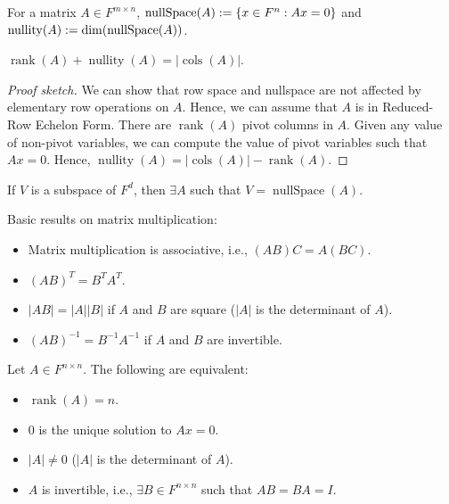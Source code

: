 \documentclass[a4paper,12pt,fleqn]{article}
\newenvironment*{tightemize}{\begin{itemize}[noitemsep]}{\end{itemize}}
\DeclareMathOperator{\rank}{rank}
\DeclareMathOperator{\cols}{cols}
\DeclareMathOperator{\nullSpace}{nullSpace}
\DeclareMathOperator{\nullity}{nullity}
\begin{document}
\begin{definition}
For a matrix $A \in F^{m \times n}$, $\nullSpace(A) \defeq \{x \in F^n: Ax = 0\}$
and $\nullity(A) \defeq \dim(\nullSpace(A))$.
\end{definition}

\begin{theorem}
$\rank(A) + \nullity(A) = |\cols(A)|$.
\end{theorem}
\begin{proof}[Proof sketch]
We can show that row space and nullspace are not affected by elementary row operations on $A$.
Hence, we can assume that $A$ is in Reduced-Row Echelon Form.
There are $\rank(A)$ pivot columns in $A$.
Given any value of non-pivot variables, we can compute the value of pivot variables
such that $Ax = 0$. Hence, $\nullity(A) = |\cols(A)| - \rank(A)$.
\end{proof}

\begin{theorem}[DWAP]
If $V$ is a subspace of $F^d$, then $\exists A$ such that $V = \nullSpace(A)$.
\end{theorem}

\begin{theorem}[DWAP]
Basic results on matrix multiplication:
\begin{tightemize}
\item Matrix multiplication is associative, i.e., $(AB)C = A(BC)$.
\item $(AB)^T = B^TA^T$.
\item $|AB| = |A||B|$ if $A$ and $B$ are square ($|A|$ is the determinant of $A$).
\item $(AB)^{-1} = B^{-1}A^{-1}$ if $A$ and $B$ are invertible.
\end{tightemize}
\end{theorem}

\begin{theorem}
Let $A \in F^{n \times n}$. The following are equivalent:
\begin{tightemize}
\item $\rank(A) = n$.
\item 0 is the unique solution to $Ax = 0$.
\item $|A| \neq 0$ ($|A|$ is the determinant of $A$).
\item $A$ is invertible, i.e., $\exists B \in F^{n \times n}$ such that $AB = BA = I$.
\end{tightemize}
\end{theorem}
\end{document}
